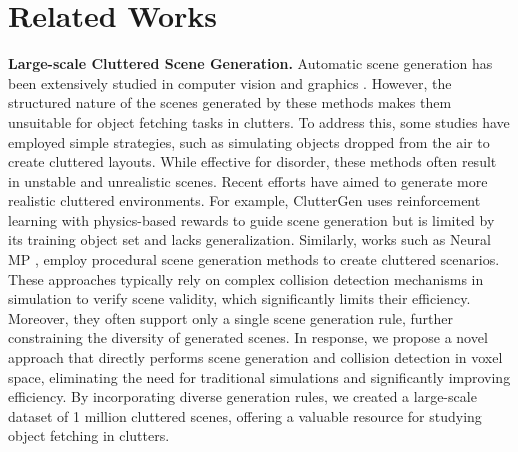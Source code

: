 \section{Related Works}


\textbf{Large-scale Cluttered Scene Generation.} Automatic scene generation has been extensively studied in computer vision and graphics \cite{wang2021sceneformer,chang2015text,chang2014learning, ritchie2019fast,paschalidou2021atiss,para2023cofs,feng2024layoutgpt,bautista2022gaudi,fu20213d}. However, the structured nature of the scenes generated by these methods makes them unsuitable for object fetching tasks in clutters. To address this, some studies \cite{wada2022safepicking, li2024broadcasting, xu2023joint, qian2024thinkgrasp,yang2024ground4act,wang2024learning} have employed simple strategies, such as simulating objects dropped from the air to create cluttered layouts. While effective for disorder, these methods often result in unstable and unrealistic scenes. Recent efforts \cite{jia2024cluttergen,zhou2024scenex,dalal2024neural,han2024fetchbench,murali2023cabinet,chamzas2021motionbenchmaker} have aimed to generate more realistic cluttered environments. For example, ClutterGen \cite{jia2024cluttergen} uses reinforcement learning with physics-based rewards to guide scene generation but is limited by its training object set and lacks generalization. Similarly, works \cite{dalal2024neural,han2024fetchbench,murali2023cabinet,chamzas2021motionbenchmaker,fishman2024avoid} such as Neural MP \cite{dalal2024neural}, employ procedural scene generation methods to create cluttered scenarios. These approaches typically rely on complex collision detection mechanisms in simulation to verify scene validity, which significantly limits their efficiency. Moreover, they often support only a single scene generation rule, further constraining the diversity of generated scenes. In response, we propose a novel approach that directly performs scene generation and collision detection in voxel space, eliminating the need for traditional simulations and significantly improving efficiency. By incorporating diverse generation rules, we created a large-scale dataset of 1 million cluttered scenes, offering a valuable resource for studying object fetching in clutters.

